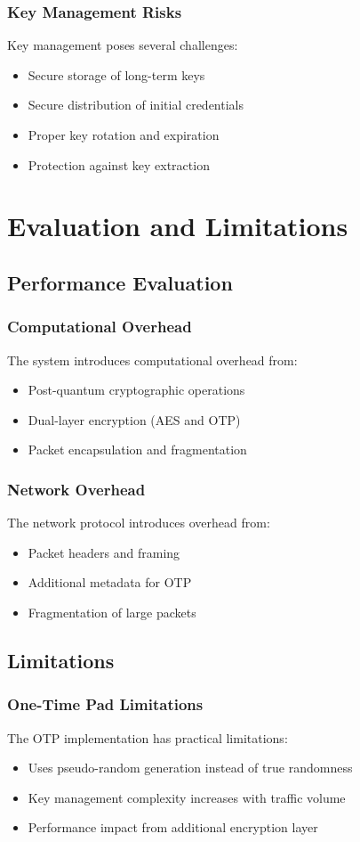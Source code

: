 \documentclass[12pt,a4paper]{report}
\begin{document}
\subsection{Key Management Risks}
Key management poses several challenges:
\begin{itemize}
    \item Secure storage of long-term keys
    \item Secure distribution of initial credentials
    \item Proper key rotation and expiration
    \item Protection against key extraction
\end{itemize}

\chapter{Evaluation and Limitations}
\section{Performance Evaluation}
\subsection{Computational Overhead}
The system introduces computational overhead from:
\begin{itemize}
    \item Post-quantum cryptographic operations
    \item Dual-layer encryption (AES and OTP)
    \item Packet encapsulation and fragmentation
\end{itemize}

\subsection{Network Overhead}
The network protocol introduces overhead from:
\begin{itemize}
    \item Packet headers and framing
    \item Additional metadata for OTP
    \item Fragmentation of large packets
\end{itemize}

\section{Limitations}
\subsection{One-Time Pad Limitations}
The OTP implementation has practical limitations:
\begin{itemize}
    \item Uses pseudo-random generation instead of true randomness
    \item Key management complexity increases with traffic volume
    \item Performance impact from additional encryption layer
\end{itemize}
\end{document}
